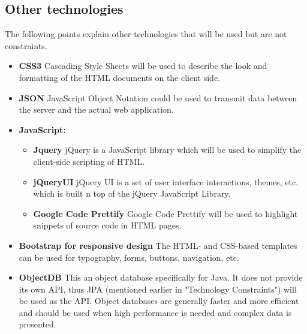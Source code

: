 \subsection{Other technologies}

The following points explain other technologies that will be used but are not constraints. 
\begin{itemize}
	\item{\textbf{CSS3}}
	\newline
	Cascading Style Sheets will be used to describe the look and formatting of the HTML documents on the client side.
	
	\item{\textbf{JSON}}
	\newline
	JavaScript Object Notation could be used to transmit data between the server and the actual web application.
	
	\item{\textbf{JavaScript:}}
		\begin{itemize}
			\item{\textbf{Jquery}}
			\newline
			jQuery is a JavaScript library which will be used to simplify the client-side scripting of HTML.
			\item{\textbf{jQueryUI}}
			\newline
			jQuery UI is a set of user interface interactions, themes, etc. which is built n top of the jQuery JavaScript Library.
			\item{\textbf{Google Code Prettify}}
			\newline
			Google Code Prettify will be used to highlight snippets of source code in HTML pages.
		\end{itemize}
	
	\item{\textbf{Bootstrap for responsive design}}		
	\newline
	The HTML- and CSS-based templates can be used for typography, forms, buttons, navigation, etc.	

	\item{\textbf{ObjectDB}}
	\newline
	This an object database specifically for Java. It does not provide its own API, thus JPA (mentioned earlier in "Technology Constraints") will be used as the API. Object databases are generally faster and more efficient and should be used when high performance is needed and complex data is presented.
\end{itemize}







